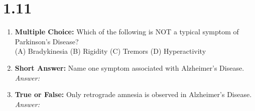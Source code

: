 \squigglyline
\section*{1.11}
\begin{enumerate}[label=\textbf{Q1.11.\arabic*}]
      \item \textbf{Multiple Choice:} Which of the following is NOT a typical symptom of Parkinson's Disease? \\
            (A) Bradykinesia \quad (B) Rigidity \quad (C) Tremors \quad (D) Hyperactivity

      \item \textbf{Short Answer:} Name one symptom associated with Alzheimer's Disease. \\
            \textit{Answer:} %

      \item \textbf{True or False:} Only retrograde amnesia is observed in Alzheimer's Disease. \\
            \textit{Answer:} %
\end{enumerate}
